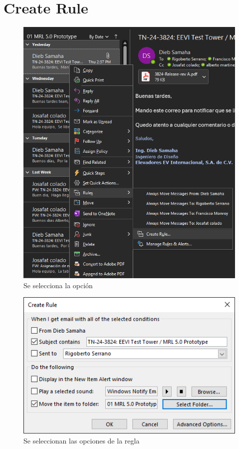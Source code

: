 \documentclass{report}
\begin{document}
\section{Create Rule}


\begin{figure}[H]
	\centering
	\includegraphics[width=0.75\linewidth, height=0.35\textheight,keepaspectratio]{Imagenes/outlook_rules03}
	\caption{Se selecciona la opción}
	\label{fig:outlookrules03}
\end{figure}

\begin{figure}[H]
	\centering
	\includegraphics[width=0.75\linewidth, height=0.35\textheight,keepaspectratio]{Imagenes/outlook_rules04}
	\caption{Se seleccionan las opciones de la regla}
	\label{fig:outlookrules04}
\end{figure}
\end{document}
